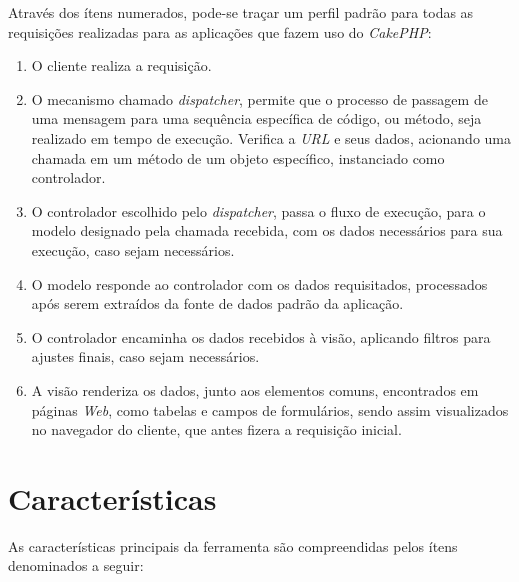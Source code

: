 Através dos ítens numerados, pode-se traçar um perfil padrão para todas as requisições realizadas para as aplicações que fazem uso do \textit{CakePHP}:
\begin{enumerate}
    \item O cliente realiza a requisição.

    \item O mecanismo chamado \textit{dispatcher}, permite que o processo de passagem de uma mensagem para uma sequência específica de código, ou método, seja realizado em tempo de execução. Verifica a \textit{URL} e seus dados, acionando uma chamada em um método de um objeto específico, instanciado como controlador.

    \item O controlador escolhido pelo \textit{dispatcher}, passa o fluxo de execução, para o modelo designado pela chamada recebida, com os dados necessários para sua execução, caso sejam necessários.

    \item O modelo responde ao controlador com os dados requisitados, processados após serem extraídos da fonte de dados padrão da aplicação.

    \item O controlador encaminha os dados recebidos à visão, aplicando filtros para ajustes finais, caso sejam necessários.

    \item A visão renderiza os dados, junto aos elementos comuns, encontrados em páginas \textit{Web}, como tabelas e campos de formulários, sendo assim visualizados no navegador do cliente, que antes fizera a requisição inicial.
\end{enumerate}

\clearpage
\section{Características}

As características principais da ferramenta são compreendidas pelos ítens denominados a seguir:

